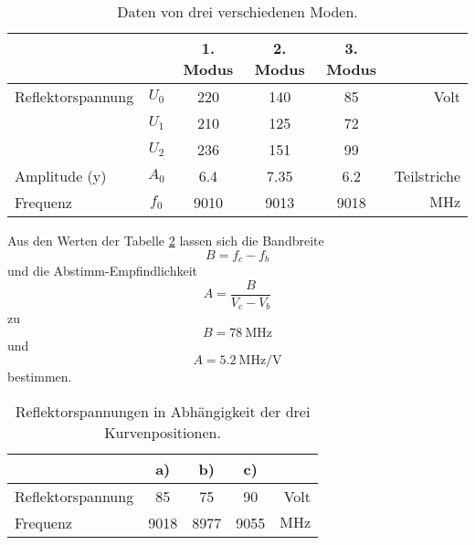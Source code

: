 \begin{table}
    \centering
    \caption{Daten von drei verschiedenen Moden.}
    \label{tab:mod}
    \renewcommand{\arraystretch}{2} 
    \begin{tabular}{|l c| c| c| c| r|}
        \hline
         & & 1. Modus & 2. Modus & 3. Modus & \\
        \hline
        Reflektorspannung & $U_0$ & 220 & 140 & 85 & Volt \\
         & $U_1$ & 210 & 125 & 72 & \\
         & $U_2$ &  236 & 151 & 99 & \\
        Amplitude (y) & $A_0$ & 6.4 & 7.35 & 6.2 & Teilstriche \\
        Frequenz & $f_0$ & 9010 & 9013 & 9018 & $\si{\mega\hertz}$\\

        \hline

    \end{tabular}
    \renewcommand{\arraystretch}{1} 
\end{table}


Aus den Werten der Tabelle \ref{tab:elek} lassen sich die Bandbreite 
\begin{equation}
    B = f_c - f_b
\end{equation}
und die Abstimm-Empfindlichkeit 
\begin{equation}
    A = \frac{B}{V_c-V_b}
\end{equation}
zu 
\begin{equation*}
    B = \SI{78}{\mega\hertz}
\end{equation*}
und 
\begin{equation*}
    A = \SI{5.2}{\mega\hertz\per\volt}
\end{equation*}
bestimmen.

\begin{table}
    \centering
    \caption{Reflektorspannungen in Abhängigkeit der drei Kurvenpositionen.}
    \label{tab:elek}
    \renewcommand{\arraystretch}{2} 
    \begin{tabular}{|l |  c| c| c| r|}
        \hline
         &  a) & b) & c) & \\
        \hline
        Reflektorspannung &  85 & 75 & 90 & Volt \\

        Frequenz & 9018 & 8977 & 9055 & $\si{\mega\hertz}$\\

        \hline

    \end{tabular}
    \renewcommand{\arraystretch}{1} 
\end{table}


